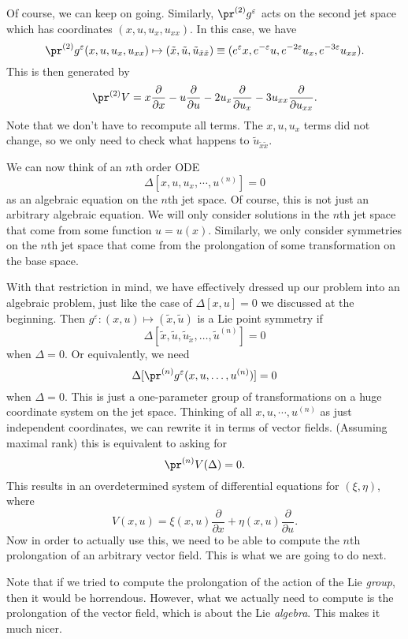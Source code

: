 \documentclass[a4paper]{article}
\begin{document}
Of course, we can keep on going. Similarly, $\pr^{(2)} g^\varepsilon$ acts on the second jet space which has coordinates $(x, u, u_x, u_{xx})$. In this case, we have
\[
  \pr^{(2)} g^\varepsilon (x, u, u_x, u_{xx}) \mapsto (\tilde{x}, \tilde{u}, \tilde{u}_{\tilde{x}\tilde{x}}) \equiv (e^\varepsilon x, e^{-\varepsilon}u, e^{-2\varepsilon} u_x, e^{-3\varepsilon}u_{xx}).
\]
This is then generated by
\[
  \pr^{(2)}V = x\frac{\partial}{\partial x} - u \frac{\partial}{\partial u} - 2 u_x \frac{\partial}{\partial u_x} - 3 u_{xx} \frac{\partial}{\partial u_{xx}}.
\]
Note that we don't have to recompute all terms. The $x, u, u_x$ terms did not change, so we only need to check what happens to $\tilde{u}_{\tilde{x}\tilde{x}}$.

We can now think of an $n$th order ODE
\[
  \Delta[x, u, u_x, \cdots, u^{(n)}] = 0
\]
as an algebraic equation on the $n$th jet space. Of course, this is not just an arbitrary algebraic equation. We will only consider solutions in the $n$th jet space that come from some function $u = u(x)$. Similarly, we only consider symmetries on the $n$th jet space that come from the prolongation of some transformation on the base space.

With that restriction in mind, we have effectively dressed up our problem into an algebraic problem, just like the case of $\Delta[x, u] = 0$ we discussed at the beginning. Then $g^\varepsilon: (x, u) \mapsto (\tilde{x}, \tilde{u})$ is a Lie point symmetry if
\[
  \Delta[\tilde{x}, \tilde{u}, \tilde{u}_{\tilde{x}}, \ldots, \tilde{u}^{(n)}] = 0
\]
when $\Delta = 0$. Or equivalently, we need
\[
  \Delta[\pr^{(n)} g^\varepsilon(x, u, \ldots, u^{(n)})] = 0
\]
when $\Delta = 0$. This is just a one-parameter group of transformations on a huge coordinate system on the jet space. Thinking of all $x, u, \cdots, u^{(n)}$ as just independent coordinates, we can rewrite it in terms of vector fields. (Assuming maximal rank) this is equivalent to asking for
\[
  \pr^{(n)}V (\Delta) = 0.
\]
This results in an overdetermined system of differential equations for $(\xi, \eta)$, where
\[
  V(x, u) = \xi(x, u) \frac{\partial}{\partial x} + \eta(x, u) \frac{\partial}{\partial u}.
\]
Now in order to actually use this, we need to be able to compute the $n$th prolongation of an arbitrary vector field. This is what we are going to do next.

Note that if we tried to compute the prolongation of the action of the Lie \emph{group}, then it would be horrendous. However, what we actually need to compute is the prolongation of the vector field, which is about the Lie \emph{algebra}. This makes it much nicer.
\end{document}
